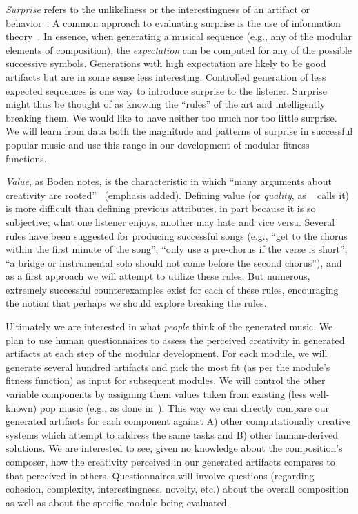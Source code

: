 \documentclass[11pt,phd]{byuprop}
\begin{document}
\emph{Surprise} refers to the unlikeliness or the interestingness of an artifact or behavior~\cite{boden2004creative}. A common approach to evaluating surprise is the use of information theory~\cite{meyer2008emotion}. In essence, when generating a musical sequence (e.g., any of the modular elements of composition), the \emph{expectation} can be computed for any of the possible successive symbols. Generations with high expectation are likely to be good artifacts but are in some sense less interesting. Controlled generation of less expected sequences is one way to introduce surprise to the listener. Surprise might thus be thought of as knowing the ``rules'' of the art and intelligently breaking them. We would like to have neither too much nor too little surprise. We will learn from data both the magnitude and patterns of surprise in successful popular music and use this range in our development of modular fitness functions.

\emph{Value}, as Boden notes, is the characteristic in which ``many arguments about creativity are rooted''~\cite{boden2004creative} (emphasis added). Defining value (or \emph{quality}, as ~\cite{ritchie2007some} calls it) is more difficult than defining previous attributes, in part because it is so subjective; what one listener enjoys, another may hate and vice versa. Several rules have been suggested for producing successful songs (e.g., ``get to the chorus within the first minute of the song'', ``only use a pre-chorus if the verse is short'', ``a bridge or instrumental solo should not come before the second chorus''), and as a first approach we will attempt to utilize these rules. But numerous, extremely successful counterexamples exist for each of these rules, encouraging the notion that perhaps we should explore breaking the rules.

Ultimately we are interested in what \emph{people} think of the generated music. We plan to use human questionnaires to assess the perceived creativity in generated artifacts at each step of the modular development. For each module, we will generate several hundred artifacts and pick the most fit (as per the module's fitness function) as input for subsequent modules. We will control the other variable components by assigning them values taken from existing (less well-known) pop music (e.g., as done in~\cite{monteith2012automatic}). This way we can directly compare our generated artifacts for each component against A) other computationally creative systems which attempt to address the same tasks and B) other human-derived solutions. We are interested to see, given no knowledge about the composition's composer, how the creativity perceived in our generated artifacts compares to that perceived in others. Questionnaires will involve questions (regarding cohesion, complexity, interestingness, novelty, etc.) about the overall composition as well as about the specific module being evaluated.
\end{document}
